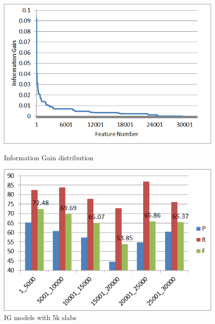 \begin{figure}
\centering
\begin{minipage}{.5\textwidth}
  \centering
  \includegraphics[width=.95\textwidth]{figures/IGDistr1.png}
  \caption{Information Gain distribution}
  \label{fig:IGDist}
\end{minipage}%
\begin{minipage}{.5\textwidth}
  \centering
  \includegraphics[width=.95\textwidth]{figures/IG5kSlabsComp.png}
  \caption{IG models with 5k slabs}
  \label{fig:IG5kComp}
\end{minipage}
\end{figure}

